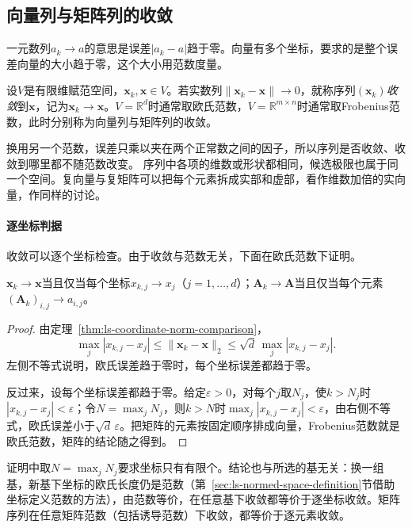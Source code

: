 \subsection{向量列与矩阵列的收敛}
\label{sec:ls-finite-dimensional-sequences}

一元数列$a_k\to a$的意思是误差$|a_k-a|$趋于零。向量有多个坐标，要求的是整个误差向量的大小趋于零，这个大小用范数度量。
\begin{definition}[向量列与矩阵列的收敛]
\label{def:multivariable-sequence-convergence}
设$V$是有限维赋范空间，$\bm x_k,\bm x\in V$。若实数列$\lVert\bm x_k-\bm x\rVert\to0$，就称序列$(\bm x_k)$\emph{收敛}到$\bm x$，记为$\bm x_k\to\bm x$。$V=\mathbb R^d$时通常取欧氏范数，$V=\mathbb R^{m\times n}$时通常取Frobenius范数，此时分别称为向量列与矩阵列的收敛。
\end{definition}
换用另一个范数，误差只乘以夹在两个正常数之间的因子，所以序列是否收敛、收敛到哪里都不随范数改变。
序列中各项的维数或形状都相同，候选极限也属于同一个空间。复向量与复矩阵可以把每个元素拆成实部和虚部，看作维数加倍的实向量，作同样的讨论。

\paragraph{逐坐标判据}
收敛可以逐个坐标检查。由于收敛与范数无关，下面在欧氏范数下证明。
\begin{theorem}[收敛等价于逐坐标收敛]
\label{thm:multivariable-coordinatewise-convergence}
$\bm x_k\to\bm x$当且仅当每个坐标$x_{k,j}\to x_j$（$j=1,\ldots,d$）；$\bm A_k\to\bm A$当且仅当每个元素$(\bm A_k)_{i,j}\to a_{i,j}$。
\end{theorem}
\begin{proof}
由定理~\ref{thm:ls-coordinate-norm-comparison}，
\[
 \max_j|x_{k,j}-x_j|\leq\lVert\bm x_k-\bm x\rVert_2\leq\sqrt d\,\max_j|x_{k,j}-x_j|.
\]
左侧不等式说明，欧氏误差趋于零时，每个坐标误差都趋于零。

反过来，设每个坐标误差都趋于零。给定$\varepsilon>0$，对每个$j$取$N_j$，使$k>N_j$时$|x_{k,j}-x_j|<\varepsilon$；令$N=\max_jN_j$，则$k>N$时$\max_j|x_{k,j}-x_j|<\varepsilon$，由右侧不等式，欧氏误差小于$\sqrt d\,\varepsilon$。把矩阵的元素按固定顺序排成向量，Frobenius范数就是欧氏范数，矩阵的结论随之得到。
\end{proof}
证明中取$N=\max_jN_j$要求坐标只有有限个。结论也与所选的基无关：换一组基，新基下坐标的欧氏长度仍是范数（第~\ref{sec:ls-normed-space-definition}节借助坐标定义范数的方法），由范数等价，在任意基下收敛都等价于逐坐标收敛。矩阵序列在任意矩阵范数（包括诱导范数）下收敛，都等价于逐元素收敛。

